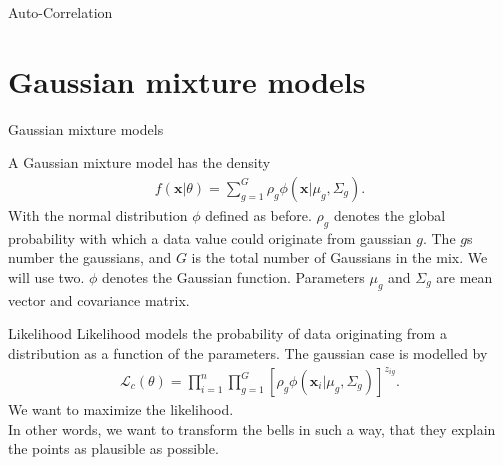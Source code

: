 \documentclass{beamer}
\begin{document}
    \begin{frame}{Auto-Correlation}
    \end{frame}

    \section{Gaussian mixture models}

    \begin{frame}{Gaussian mixture models}
    
    A Gaussian mixture model has the density \cite{mcnicholas2016mixture}
    \begin{align}
        f(\mathbf{x}| \theta)  = \sum_{g=1}^G \rho_g \phi(\mathbf{x}|\mu_g, \Sigma_g).
    \end{align}
    With the normal distribution $\phi$ defined as before. $\rho_g$ denotes the global probability with which a data value could originate from gaussian $g$. The $g$s number the gaussians, and $G$ is the total number of Gaussians in the mix. We will use two. $\phi$ denotes the Gaussian function. Parameters $\mu_g$ and $\Sigma_g$ are mean vector and covariance matrix.
    \end{frame}

    \begin{frame}{Likelihood}
      Likelihood models the probability of data originating from a distribution as a function of the 
      parameters. The gaussian case is modelled by \cite{mcnicholas2016mixture}
      \begin{align}
        \mathcal{L}_c(\theta) = \prod_{i=1}^{n}\prod_{g=1}^G [\rho_g \phi(\mathbf{x}_i|\mu_g, \Sigma_g)]^{z_{ig}}.
      \end{align}
      We want to maximize the likelihood. \\
      In other words, we want to transform the bells in such a way, that 
      they explain the points as plausible as possible.
    \end{frame}
\end{document}
